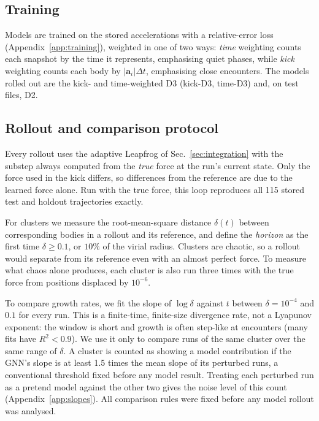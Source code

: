 \documentclass[a4paper,journal]{IEEEtran}
\newcommand{\vect}[1]{\mathbf{#1}}
\begin{document}
\subsection{Training}\label{sec:training}

Models are trained on the stored accelerations with a relative-error loss (Appendix~\ref{app:training}), weighted in one of two ways: \emph{time} weighting counts each snapshot by the time it represents, emphasising quiet phases, while \emph{kick} weighting counts each body by $|\vect a_i|\Delta t$, emphasising close encounters. The models rolled out are the kick- and time-weighted D3 (kick-D3, time-D3) and, on test files, D2.

\subsection{Rollout and comparison protocol}\label{sec:protocol}

Every rollout uses the adaptive Leapfrog of Sec.~\ref{sec:integration} with the substep always computed from the \emph{true} force at the run's current state. Only the force used in the kick differs, so differences from the reference are due to the learned force alone. Run with the true force, this loop reproduces all 115 stored test and holdout trajectories exactly.

For clusters we measure the root-mean-square distance $\delta(t)$ between corresponding bodies in a rollout and its reference, and define the \emph{horizon} as the first time $\delta\ge0.1$, or $10\%$ of the virial radius. Clusters are chaotic, so a rollout would separate from its reference even with an almost perfect force. To measure what chaos alone produces, each cluster is also run three times with the true force from positions displaced by $10^{-6}$.

To compare growth rates, we fit the slope of $\log\delta$ against $t$ between $\delta=10^{-4}$ and $0.1$ for every run. This is a finite-time, finite-size divergence rate, not a Lyapunov exponent: the window is short and growth is often step-like at encounters (many fits have $R^2<0.9$). We use it only to compare runs of the same cluster over the same range of $\delta$. A cluster is counted as showing a model contribution if the GNN's slope is at least 1.5 times the mean slope of its perturbed runs, a conventional threshold fixed before any model result. Treating each perturbed run as a pretend model against the other two gives the noise level of this count (Appendix~\ref{app:slopes}). All comparison rules were fixed before any model rollout was analysed.
\end{document}
